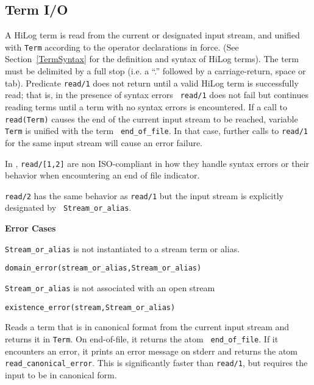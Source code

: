 \subsection{Term I/O}
\begin{description}
    A HiLog term is read from the current or designated input stream,
    and unified with {\tt Term} according to the operator declarations
    in force.  (See Section~\ref{TermSyntax} for the definition and
    syntax of HiLog terms). The term must be delimited by a full stop
    (i.e. a ``.'' followed by a carriage-return, space or tab).
    Predicate {\tt read/1} does not return until a valid HiLog term is
    successfully read; that is, in the presence of syntax errors {\tt
    read/1} does not fail but continues reading terms until a term
    with no syntax errors is encountered.  If a call to {\tt
    read(Term)} causes the end of the current input stream to be
    reached, variable {\tt Term} is unified with the term {\tt
    end\_of\_file}.  In that case, further calls to {\tt read/1} for
    the same input stream will cause an error failure.

%
In \version, {\tt read/[1,2]} are non ISO-compliant in how they
handle syntax errors or their behavior when encountering an end of
file indicator.


	{\tt read/2} has the same behavior as {\tt read/1} but the
	input stream is explicitly designated by {\tt
	Stream\_or\_alias}.

{\bf Error Cases}
\bi
\item 	{\tt Stream\_or\_alias} is not instantiated to a stream term or alias.
\bi
\item 	{\tt domain\_error(stream\_or\_alias,Stream\_or\_alias)}
\ei
\item 	{\tt Stream\_or\_alias} is not associated with an open stream
\bi
\item 	{\tt existence\_error(stream,Stream\_or\_alias)}
\ei
\ei

Reads a term that is in canonical format from the current input stream
and returns it in {\tt Term}. On end-of-file, it returns the atom {\tt
end\_of\_file}.  If it encounters an error, it prints an error message
on stderr and returns the atom {\tt read\_canonical\_error}. This is
significantly faster than {\tt read/1}, but requires the input to be
in canonical form.


\end{description}
